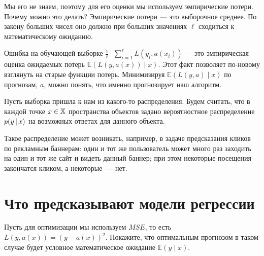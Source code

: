 \documentclass[12pt,a4paper]{article}
\begin{document}
Мы его не знаем, поэтому для его оценки мы используем эмпирические потери. Почему можно это делать? Эмпирические потери --- это выборочное среднее. По закону больших чисел оно должно при больших значениях $\ell$ сходиться к математическому ожиданию.

Ошибка на обучающей выборке $\frac{1}{\ell} \cdot \sum_{i=1}^{\ell} L(y_i, a(x_i))$ --- это эмпирическая оценка ожидаемых потерь $\mathbb{E}(L(y, a(x)) \mid x)$. Этот факт позволяет по-новому взглянуть на старые функции потерь. Минимизируя $\mathbb{E}(L(y, a) \mid x)$ по прогнозам, $a$, можно понять, что именно прогнозирует наш алгоритм. 

Пусть выборка пришла к нам из какого-то распределения. Будем считать, что в каждой точке $x \in \mathbb{X}$ пространства объектов задано вероятностное распределение~$p(y \mspace{3mu}{|}\mspace{3mu} x)$ на возможных ответах для данного объекта.

Такое распределение может возникать, например, в задаче предсказания кликов по рекламным баннерам:
один и тот же пользователь может много раз заходить на один и тот же сайт и видеть данный баннер;
при этом некоторые посещения закончатся кликом, а некоторые~--- нет.

\section{Что предсказывают модели регрессии}

\begin{vkProblem}
    Пусть для оптимизации мы используем $MSE$, то есть $L(y, a(x)) = (y - a(x))^2.$ Покажите, что оптимальным прогнозом в таком случае будет условное математическое ожидание $\mathbb{E}(y \mid x).$
\end{vkProblem}
\end{document}
